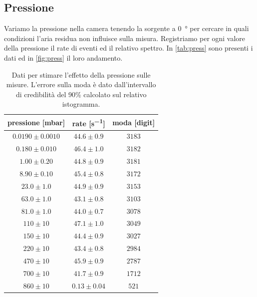 \subsection{Pressione}

Variamo la pressione nella camera tenendo la sorgente a \SI{0}{\degree} per cercare in quali condizioni l'aria residua non influisce sulla misura.
Registriamo per ogni valore della pressione il rate di eventi ed il relativo spettro. In \autoref{tab:press} sono presenti i dati ed in \autoref{fig:press} il loro andamento.



\begin{table}[h]
\centering
\begin{tabular}{|c|c|c|}
\hline
pressione [mbar] & rate [\si{s^{-1}}] & moda [digit] \\
\hline
$ 0.0190 \pm 0.0010 $ & $ 44.6 \pm 0.9 $ & $ 3183 $ \\ 
$ 0.180 \pm 0.010 $ & $ 46.4 \pm 1.0 $ & $ 3182 $ \\ 
$ 1.00 \pm 0.20 $ & $ 44.8 \pm 0.9 $ & $ 3181 $ \\ 
$ 8.90 \pm 0.10 $ & $ 45.4 \pm 0.8 $ & $ 3172 $ \\ 
$ 23.0 \pm 1.0 $ & $ 44.9 \pm 0.9 $ & $ 3153 $ \\ 
$ 63.0 \pm 1.0 $ & $ 43.1 \pm 0.8 $ & $ 3103 $ \\ 
$ 81.0 \pm 1.0 $ & $ 44.0 \pm 0.7 $ & $ 3078 $ \\ 
$ 110 \pm 10 $ & $ 47.1 \pm 1.0 $ & $ 3049 $ \\ 
$ 150 \pm 10 $ & $ 44.4 \pm 0.9 $ & $ 3027 $ \\ 
$ 220 \pm 10 $ & $ 43.4 \pm 0.8 $ & $ 2984 $ \\ 
$ 470 \pm 10 $ & $ 45.9 \pm 0.9 $ & $ 2787 $ \\ 
$ 700 \pm 10 $ & $ 41.7 \pm 0.9 $ & $ 1712 $ \\ 
$ 860 \pm 10 $ & $ 0.13 \pm 0.04 $ & $ 521 $ \\ 
\hline
\end{tabular}
\caption{Dati per stimare l'effetto della pressione sulle misure. L'errore sulla moda è dato dall'intervallo di credibilità del 90\% calcolato sul relativo istogramma.}
\label{tab:press}
\end{table}

